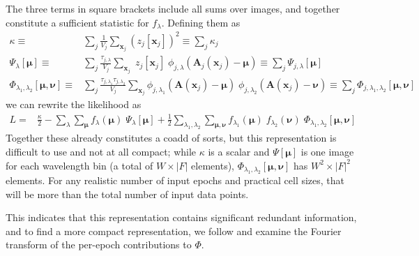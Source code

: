 \documentclass[DM,authoryear,toc]{lsstdoc}
\begin{document}
The three terms in square brackets include all sums over images, and together constitute a sufficient statistic for $f_\lambda$.
Defining them as
\begin{align}
    \kappa \equiv &
        \sum_{j}
            \frac{1}{V_j}
        \sum_{\bm{x}_j}
            \left(z_j[\bm{x}_j]\right)^2
        \equiv \sum_{j} \kappa_j
    \label{eqn:kappa-accumulated}
    \\
    \Psi_{\lambda}[\bm{\mu}] \equiv &
        \sum_{j}
        \frac{\tau_{j,\lambda}}{V_j}
        \sum_{\bm{x}_j}
            \; z_j[\bm{x}_j]
            \; \phi_{j,\lambda}\!\left(
                \bm{A}_j(\bm{x}_j) - \bm{\mu}
            \right)
        \equiv \sum_{j} \Psi_{j,\lambda}[\bm{\mu}]
    \label{eqn:psi-accumulated}
    \\
    \Phi_{\lambda_1,\lambda_2}[\bm{\mu},\bm{\nu}] \equiv &
        \sum_{j}
        \frac{
            \tau_{j,\lambda_1}
            \tau_{j,\lambda_2}
        }{
            V_j
        }
        \sum_{\bm{x}_j}
            \phi_{j,\lambda_1}\!\left(
                \bm{A}(\bm{x}_j) - \bm{\mu}
            \right)
            \; \phi_{j,\lambda_2}\!\left(
                \bm{A}(\bm{x}_j) - \bm{\nu}
            \right)
    \equiv \sum_{j} \Phi_{j,\lambda_1,\lambda_2}[\bm{\mu},\bm{\nu}]
    \label{eqn:phi-accumulated}
\end{align}
we can rewrite the likelihood as
\begin{align}
L =&
    \frac{\kappa}{2}
-
    \sum_{\lambda}
    \sum_{\bm{\mu}}
    f_{\lambda}(\bm{\mu})
    \;\Psi_{\lambda}[\bm{\mu}]
+
    \frac{1}{2}
    \sum_{\lambda_1,\lambda_2}
    \sum_{\bm{\mu},\bm{\nu}}
    f_{\lambda_1}(\bm{\mu}) \;
    f_{\lambda_2}(\bm{\nu}) \;
    \Phi_{\lambda_1,\lambda_2}[\bm{\mu},\bm{\nu}]
\end{align}
Together these already constitutes a coadd of sorts, but this representation is difficult to use and not at all compact; while $\kappa$ is a scalar and $\Psi[\bm{\mu}]$ is one image for each wavelength bin (a total of $W\times|F|$ elements), $\Phi_{\lambda_1,\lambda_2}[\bm{\mu},\bm{\nu}]$ has $W^2 \times |F|^2$ elements.
For any realistic number of input epochs and practical cell sizes, that will be more than the total number of input data points.

This indicates that this representation contains significant redundant information, and to find a more compact representation, we follow \citet{2015arXiv151206879Z} and examine the Fourier transform of the per-epoch contributions to $\Phi$.
\end{document}
